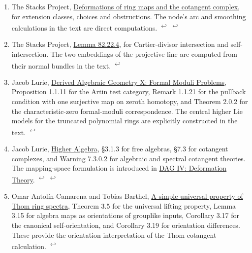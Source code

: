 \documentclass[11pt,letterpaper]{article}
\begin{document}
\begin{enumerate}[leftmargin=1.8em,label=\arabic*.,itemsep=.8em]
\item \hypertarget{note-deformations}{}The Stacks Project, \href{https://stacks.math.columbia.edu/tag/08SM}{Deformations of ring maps and the cotangent complex}, for extension classes, choices and obstructions. The node's arc and smoothing calculations in the text are direct computations. \hyperlink{citation-deformations-1}{\textsuperscript{\(\hookleftarrow\)}} \hyperlink{citation-deformations-2}{\textsuperscript{\(\hookleftarrow\)}}
\item \hypertarget{note-intersection}{}The Stacks Project, \href{https://stacks.math.columbia.edu/tag/0ER4}{Lemma 82.22.4}, for Cartier-divisor intersection and self-intersection. The two embeddings of the projective line are computed from their normal bundles in the text. \hyperlink{citation-intersection-1}{\textsuperscript{\(\hookleftarrow\)}}
\item \hypertarget{note-formal-moduli}{}Jacob Lurie, \href{https://www.math.ias.edu/~lurie/papers/DAG-X.pdf}{Derived Algebraic Geometry X: Formal Moduli Problems}, Proposition 1.1.11 for the Artin test category, Remark 1.1.21 for the pullback condition with one surjective map on zeroth homotopy, and Theorem 2.0.2 for the characteristic-zero formal-moduli correspondence. The central higher Lie models for the truncated polynomial rings are explicitly constructed in the text. \hyperlink{citation-formal-moduli-1}{\textsuperscript{\(\hookleftarrow\)}}
\item \hypertarget{note-higher-algebra}{}Jacob Lurie, \href{https://www.math.ias.edu/~lurie/papers/HA.pdf}{Higher Algebra}, §3.1.3 for free algebras, §7.3 for cotangent complexes, and Warning 7.3.0.2 for algebraic and spectral cotangent theories. The mapping-space formulation is introduced in \href{https://www.math.ias.edu/~lurie/papers/DAG-IV.pdf}{DAG IV: Deformation Theory}. \hyperlink{citation-higher-algebra-1}{\textsuperscript{\(\hookleftarrow\)}} \hyperlink{citation-higher-algebra-2}{\textsuperscript{\(\hookleftarrow\)}}
\item \hypertarget{note-thom-orientations}{}Omar Antolín-Camarena and Tobias Barthel, \href{https://arxiv.org/pdf/1411.7988}{A simple universal property of Thom ring spectra}, Theorem 3.5 for the universal lifting property, Lemma 3.15 for algebra maps as orientations of grouplike inputs, Corollary 3.17 for the canonical self-orientation, and Corollary 3.19 for orientation differences. These provide the orientation interpretation of the Thom cotangent calculation. \hyperlink{citation-thom-orientations-1}{\textsuperscript{\(\hookleftarrow\)}}

\end{enumerate}
\end{document}
